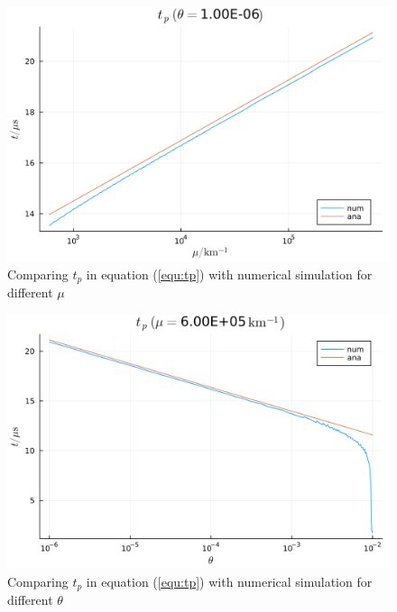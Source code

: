 \documentclass[aps,prd,twocolumn,amsmath,amssymb,groupedaddress]{revtex4-2}
\begin{document}
\begin{figure}[b]
	\includegraphics[scale=0.13]{compare_tp_mu.png}
	\caption{\label{fig:compare_tp_mu} Comparing $t_p$ in equation (\ref{equ:tp}) with numerical simulation for different $\mu$}
\end{figure}
\begin{figure}[b]
	\includegraphics[scale=0.13]{compare_tp_theta.png}
	\caption{\label{fig:compare_tp_theta} Comparing $t_p$ in equation (\ref{equ:tp}) with numerical simulation for different $\theta$}
\end{figure}
\end{document}
